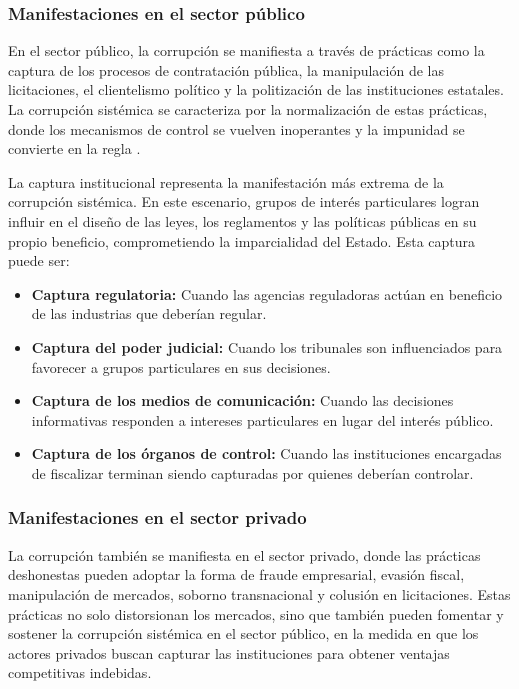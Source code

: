 \documentclass[12pt,a4paper]{article}
\begin{document}
\subsubsection{Manifestaciones en el sector público}

En el sector público, la corrupción se manifiesta a través de prácticas como la captura de los procesos de contratación pública, la manipulación de las licitaciones, el clientelismo político y la politización de las instituciones estatales. La corrupción sistémica se caracteriza por la normalización de estas prácticas, donde los mecanismos de control se vuelven inoperantes y la impunidad se convierte en la regla \parencite{transparencia2023}.

La captura institucional representa la manifestación más extrema de la corrupción sistémica. En este escenario, grupos de interés particulares logran influir en el diseño de las leyes, los reglamentos y las políticas públicas en su propio beneficio, comprometiendo la imparcialidad del Estado. Esta captura puede ser:
\begin{itemize}
    \item \textbf{Captura regulatoria:} Cuando las agencias reguladoras actúan en beneficio de las industrias que deberían regular.
    \item \textbf{Captura del poder judicial:} Cuando los tribunales son influenciados para favorecer a grupos particulares en sus decisiones.
    \item \textbf{Captura de los medios de comunicación:} Cuando las decisiones informativas responden a intereses particulares en lugar del interés público.
    \item \textbf{Captura de los órganos de control:} Cuando las instituciones encargadas de fiscalizar terminan siendo capturadas por quienes deberían controlar.
\end{itemize}

\subsubsection{Manifestaciones en el sector privado}

La corrupción también se manifiesta en el sector privado, donde las prácticas deshonestas pueden adoptar la forma de fraude empresarial, evasión fiscal, manipulación de mercados, soborno transnacional y colusión en licitaciones. Estas prácticas no solo distorsionan los mercados, sino que también pueden fomentar y sostener la corrupción sistémica en el sector público, en la medida en que los actores privados buscan capturar las instituciones para obtener ventajas competitivas indebidas.
\end{document}
